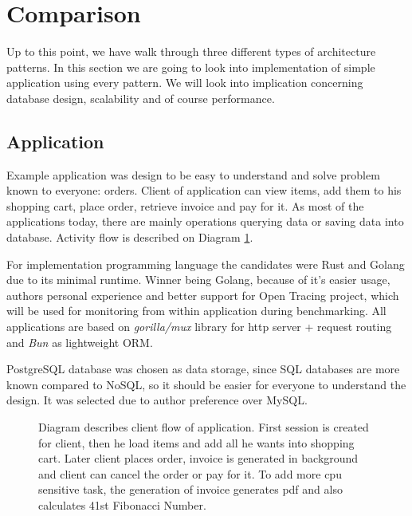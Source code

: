 

\section{Comparison}
Up to this point, we have walk through three different types of architecture patterns. In this section we are going to look into implementation of simple application using every pattern. We will look into implication concerning database design, scalability and of course performance.

\subsection{Application}
Example application was design to be easy to understand and solve problem known to everyone: orders. Client of application can view items, add them to his shopping cart, place order, retrieve invoice and pay for it. As most of the applications today, there are mainly operations querying data or saving data into database. Activity flow is described on Diagram \ref{img:app_activity_flow}.

For implementation programming language the candidates were Rust and Golang due to its minimal runtime. Winner being Golang, because of it's easier usage, authors personal experience and better support for Open Tracing project, which will be used for monitoring from within application during benchmarking. All applications are based on \textit{gorilla/mux} \cite{MUX} library for http server + request routing and \textit{Bun} \cite{BUN} as lightweight ORM.

PostgreSQL database was chosen as data storage, since SQL databases are more known compared to NoSQL, so it should be easier for everyone to understand the design. It was selected due to author preference over MySQL.
\begin{figure}
    \centering
    
    \caption{Diagram describes client flow of application. First session is created for client, then he load items and add all he wants into shopping cart. Later client places order, invoice is generated in background and client can cancel the order or pay for it. To add more cpu sensitive task, the generation of invoice generates pdf and also calculates 41st Fibonacci Number. \label{img:app_activity_flow}}
\end{figure}

